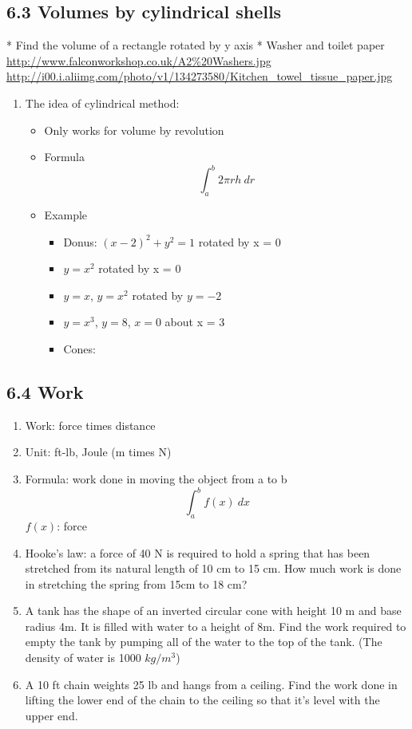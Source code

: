 \documentclass{article}
\begin{document}
\subsection{6.3 Volumes by cylindrical shells}
* Find the volume of a rectangle rotated by y axis
* Washer and toilet paper\\

\url{http://www.falconworkshop.co.uk/A2%20Washers.jpg}\\

\url{http://i00.i.aliimg.com/photo/v1/134273580/Kitchen_towel_tissue_paper.jpg}
\begin{enumerate}
\item The idea of cylindrical method:
\begin{itemize}
\item Only works for volume by revolution
\item Formula
$$
\int_a^b 2\pi r h~dr
$$
\item 
Example
\begin{itemize}
\item Donus: $(x-2)^2+y^2 = 1$ rotated by x = 0
\item $y = x^2$ rotated by x = 0
\item $y = x$, $y = x^2$ rotated by $y = -2$
\item $y = x^3$, $y = 8$, $x = 0$ about  x = 3
\item Cones:
\end{itemize}


\end{itemize}
\end{enumerate}


\subsection{6.4 Work}
\begin{enumerate}
\item Work: force times distance
\item Unit: ft-lb, Joule (m times N)
\item Formula: work done in moving the object from a to b
$$
\int_a^b f(x)~dx
$$
$f(x)$: force
\item Hooke's law: a force of 40 N is required to hold a spring that has been stretched from its natural length of 10 cm to 15 cm. How much work is done in stretching the spring from 15cm to 18 cm? 
\item A tank has the shape of an inverted circular cone with height 10 m and base radius 4m. It is filled with water to a height of 8m. Find the work required to empty the tank by pumping all of the water to the top of the tank.  (The density of water is 1000 $kg/m^3$)
\item A 10 ft chain weights 25 lb and hangs from a ceiling. Find the work done in lifting the lower end of the chain to the ceiling so that it's level with the upper end.
\end{enumerate}
\end{document}
